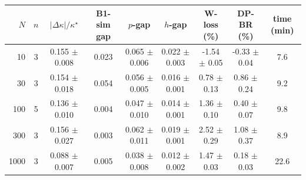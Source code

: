\begin{tabular}{rcccccccc}
\toprule
$N$ & $n$ & $|\Delta\kappa|/\kappa^\star$ & B1-sim gap & $p$-gap & $h$-gap & W-loss (\%) & DP-BR (\%) & time (min)\\
\midrule
10 & 3 & 0.155 $\pm$ 0.008 & 0.023 & 0.065 $\pm$ 0.006 & 0.022 $\pm$ 0.003 & -1.54 $\pm$ 0.05 & -0.33 $\pm$ 0.04 & 7.6\\
30 & 3 & 0.154 $\pm$ 0.018 & 0.054 & 0.056 $\pm$ 0.005 & 0.016 $\pm$ 0.001 & 0.78 $\pm$ 0.13 & 0.86 $\pm$ 0.24 & 9.2\\
100 & 5 & 0.136 $\pm$ 0.010 & 0.004 & 0.047 $\pm$ 0.010 & 0.014 $\pm$ 0.001 & 1.36 $\pm$ 0.10 & 0.40 $\pm$ 0.07 & 9.8\\
300 & 3 & 0.156 $\pm$ 0.027 & 0.003 & 0.062 $\pm$ 0.011 & 0.019 $\pm$ 0.001 & 2.52 $\pm$ 0.29 & 1.08 $\pm$ 0.37 & 8.9\\
1000 & 3 & 0.088 $\pm$ 0.007 & 0.005 & 0.038 $\pm$ 0.008 & 0.012 $\pm$ 0.002 & 1.47 $\pm$ 0.03 & 0.18 $\pm$ 0.03 & 22.6\\
\bottomrule
\end{tabular}
